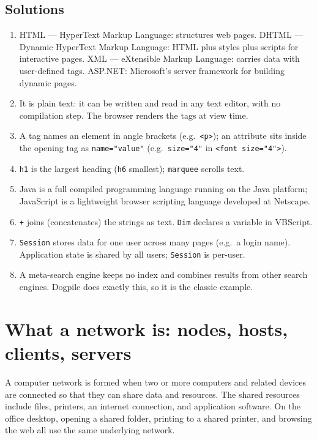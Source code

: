 \subsection*{Solutions}
\begingroup\small
\begin{enumerate}[label=\arabic*.]
  \item HTML --- HyperText Markup Language: structures web pages. DHTML --- Dynamic HyperText Markup Language: HTML plus styles plus scripts for interactive pages. XML --- eXtensible Markup Language: carries data with user-defined tags. ASP.NET: Microsoft's server framework for building dynamic pages.
  \item It is plain text: it can be written and read in any text editor, with no compilation step. The browser renders the tags at view time.
  \item A tag names an element in angle brackets (e.g.\ \texttt{<p>}); an attribute sits inside the opening tag as \texttt{name="value"} (e.g.\ \texttt{size="4"} in \texttt{<font size="4">}).
  \item \texttt{h1} is the largest heading (\texttt{h6} smallest); \texttt{marquee} scrolls text.
  \item Java is a full compiled programming language running on the Java platform; JavaScript is a lightweight browser scripting language developed at Netscape.
  \item \texttt{+} joins (concatenates) the strings as text. \texttt{Dim} declares a variable in VBScript.
  \item \texttt{Session} stores data for one user across many pages (e.g.\ a login name). Application state is shared by all users; \texttt{Session} is per-user.
  \item A meta-search engine keeps no index and combines results from other search engines. Dogpile does exactly this, so it is the classic example.
\end{enumerate}
\endgroup

\section{What a network is: nodes, hosts, clients, servers}
A computer network is formed when two or more computers and related devices
are connected so that they can share data and resources. The shared
resources include files, printers, an internet connection, and application
software. On the office desktop, opening a shared folder, printing to a
shared printer, and browsing the web all use the same underlying network.

